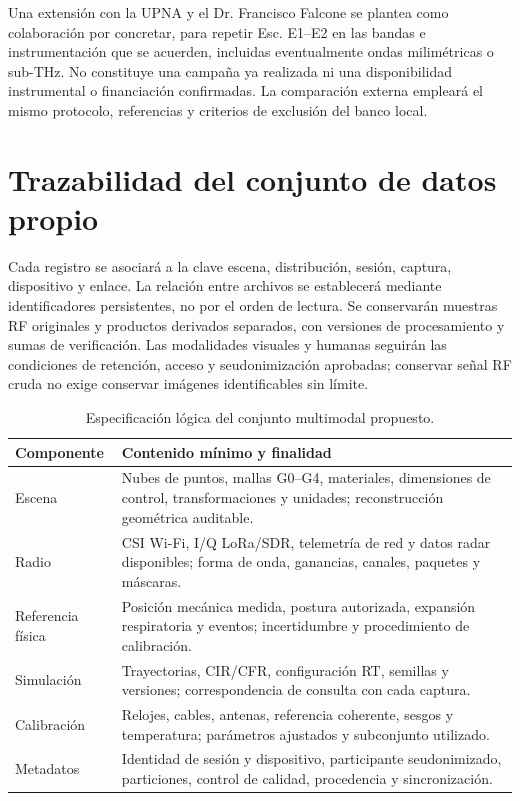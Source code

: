 Una extensión con la UPNA y el Dr. Francisco Falcone se plantea como colaboración
por concretar, para repetir Esc. E1--E2 en las bandas e instrumentación que se acuerden,
incluidas eventualmente ondas milimétricas o sub-THz. No constituye una campaña ya
realizada ni una disponibilidad instrumental o financiación confirmadas. La comparación
externa empleará el mismo protocolo, referencias y criterios de exclusión del banco local.

\section{Trazabilidad del conjunto de datos propio}
\label{sec:own_dataset_schema}

Cada registro se asociará a la clave escena, distribución, sesión, captura, dispositivo
y enlace. La relación entre archivos se establecerá mediante identificadores persistentes,
no por el orden de lectura. Se conservarán muestras RF originales y productos derivados
separados, con versiones de procesamiento y sumas de verificación. Las modalidades
visuales y humanas seguirán las condiciones de retención, acceso y seudonimización
aprobadas; conservar señal RF cruda no exige conservar imágenes identificables sin límite.

\begin{table}[htbp]
\centering\small
\caption{Especificación lógica del conjunto multimodal propuesto.}
\label{tab:own_dataset_schema}
\begin{tabularx}{\textwidth}{P{2.5cm}L}
\toprule
Componente & Contenido mínimo y finalidad\\
\midrule
Escena & Nubes de puntos, mallas G0--G4, materiales, dimensiones de control,
transformaciones y unidades; reconstrucción geométrica auditable.\\
Radio & CSI Wi-Fi, I/Q LoRa/SDR, telemetría de red y datos radar disponibles;
forma de onda, ganancias, canales, paquetes y máscaras.\\
Referencia física & Posición mecánica medida, postura autorizada, expansión respiratoria
y eventos; incertidumbre y procedimiento de calibración.\\
Simulación & Trayectorias, CIR/CFR, configuración RT, semillas y versiones;
correspondencia de consulta con cada captura.\\
Calibración & Relojes, cables, antenas, referencia coherente, sesgos y temperatura;
parámetros ajustados y subconjunto utilizado.\\
Metadatos & Identidad de sesión y dispositivo, participante seudonimizado,
particiones, control de calidad, procedencia y sincronización.\\
\bottomrule
\end{tabularx}
\end{table}

